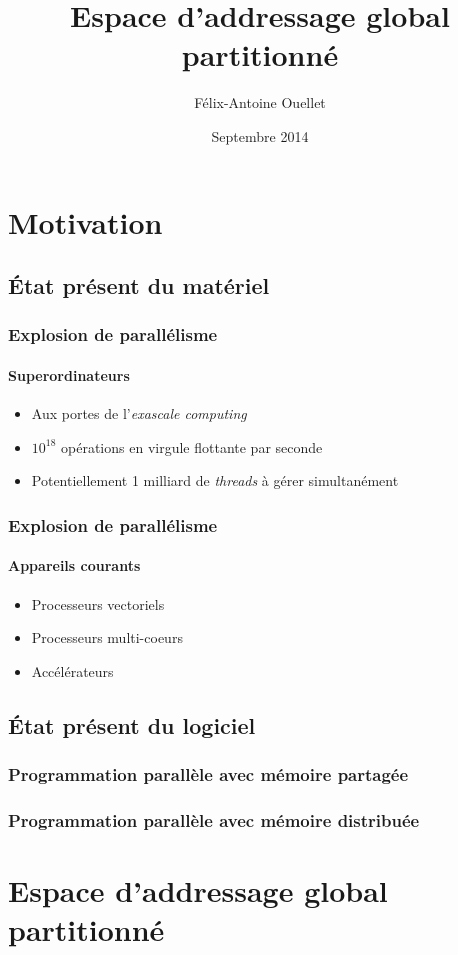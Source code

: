 \documentclass{beamer}
\author[Félix-Antoine Ouellet]{Félix-Antoine Ouellet}
\title[PGAS\hspace{2em}\insertframenumber/\inserttotalframenumber]{Espace d'addressage global partitionné}
\institute{Université de Sherbrooke}
\date{Septembre 2014}
\begin{document}
\begin{frame}
\titlepage %
\end{frame}

\section{Motivation}
\subsection{État présent du matériel}
\begin{frame}
\frametitle{Explosion de parallélisme}
\framesubtitle{Superordinateurs}
\begin{itemize}
\item Aux portes de l'\textit{exascale computing}
\item $10^{18}$ opérations en virgule flottante par seconde
\item Potentiellement 1 milliard de \textit{threads} à gérer simultanément
\end{itemize}
\end{frame}

\begin{frame}
\frametitle{Explosion de parallélisme}
\framesubtitle{Appareils courants}
\begin{itemize}
\item Processeurs vectoriels
\item Processeurs multi-coeurs
\item Accélérateurs
\end{itemize}
\end{frame}

\subsection{État présent du logiciel}
\begin{frame}
\frametitle{Programmation parallèle avec mémoire partagée}
\end{frame}

\begin{frame}
\frametitle{Programmation parallèle avec mémoire distribuée}
\end{frame}

\section{Espace d'addressage global partitionné}
\begin{frame}
\frametitle{}
\end{frame}
\end{document}
